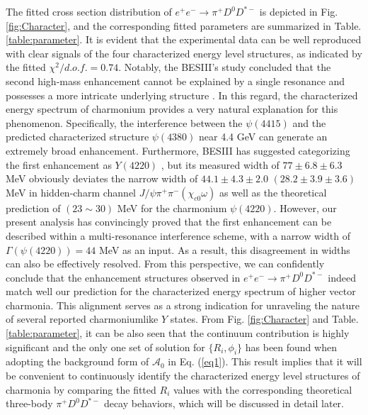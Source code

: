 \documentclass[final,5p,times,twocolumn]{elsarticle}
\begin{document}

The fitted cross section distribution of $e^+e^- \to\pi^+ D^0 D^{*-}$ is depicted in Fig. \ref{fig:Character}, and the corresponding fitted parameters are summarized in Table. \ref{table:parameter}. It is evident that the experimental data can be well reproduced with clear signals of the four characterized energy level structures, as indicated by the fitted $\chi^2/d.o.f.=0.74$. Notably, the BESIII's study concluded that the second high-mass enhancement cannot be explained by a single resonance and possesses a more intricate underlying structure \cite{BESIII:2018iea}. In this regard, the characterized energy spectrum of charmonium provides a very natural explanation for this phenomenon. Specifically, the interference between the $\psi(4415)$ and the predicted characterized structure $\psi(4380)$ near 4.4 GeV can generate an extremely broad enhancement. Furthermore, BESIII has suggested categorizing the first enhancement as $Y(4220)$ \cite{BESIII:2018iea}, but its measured width of $77\pm6.8\pm6.3$ MeV \cite{BESIII:2018iea} obviously deviates the narrow width of $44.1\pm4.3\pm2.0$ $(28.2\pm3.9\pm3.6)$ MeV in hidden-charm channel $J/\psi\pi^+\pi^-(\chi_{c0}\omega)$ \cite{BESIII:2016bnd,BESIII:2019gjc} as well as the theoretical prediction of $(23\sim30)$ MeV \cite{Wang:2019mhs} for the charmonium $\psi(4220)$. However, our present analysis has convincingly proved that the first enhancement can be described within a multi-resonance interference scheme, with a narrow width of $\Gamma(\psi(4220))=44$ MeV as an input. As a result, this disagreement in widths can also be  effectively resolved.
From this perspective, we can confidently conclude that the enhancement structures observed in $e^+e^- \to\pi^+ D^0 D^{*-}$ indeed match well our prediction for the characterized energy spectrum of higher vector charmonia. This alignment serves as a strong indication for unraveling the nature of several reported charmoniumlike $Y$ states.   From Fig. \ref{fig:Character} and Table. \ref{table:parameter}, it can be also seen that the continuum contribution is highly significant and the only one set of solution for $\{R_i,\phi_i\}$ has been found when adopting the background form of $\mathcal{A}_0$ in Eq. (\ref{eq1}). This result implies that it will be convenient to continuously identify the characterized energy level structures of charmonia by comparing the fitted $R_i$ values with the corresponding theoretical three-body $\pi^+ D^0 D^{*-}$ decay behaviors, which will be discussed in detail later.  
\end{document}
